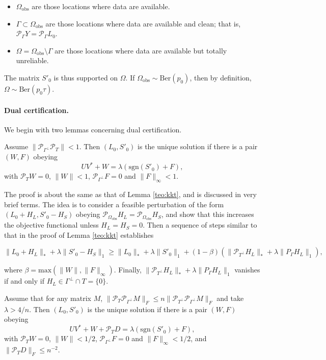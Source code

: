 \begin{itemize}
\item $\Omega_{\text{obs}}$ are those locations where data are available.
\item $\Gamma \subset \Omega_{\text{obs}}$ are those locations where data are available and clean; that is, $\mathcal{P}_\Gamma Y = \mathcal{P}_\Gamma L_0$.
\item $\Omega = \Omega_{\text{obs}} \setminus \Gamma$ are those locations where data are available but totally unreliable.
\end{itemize}

The matrix $S'_0$ is thus supported on $\Omega$. If $\Omega_{\text{obs}} \sim
\text{Ber}(p_0)$, then by definition, $\Omega \sim \text{Ber}(p_0
\tau)$.

\paragraph{Dual certification.} We begin with two lemmas concerning dual certification.

\begin{lemma}
\label{teo:kkt2}
Assume $\|\mathcal{P}_{\Gamma^\perp} \mathcal{P}_T\| < 1$.  Then $(L_0, S'_0)$ is the unique solution if there is a pair $(W, F)$ obeying
\[
UV^* + W = \lambda(\textrm{sgn}(S'_0) + F),  
\]
with $\mathcal{P}_T W = 0 $, $\|W\| < 1$, $\mathcal{P}_{\Gamma^\perp} F = 0$ and $\|F\|_\infty < 1$.
\end{lemma}

The proof is about the same as that of Lemma \ref{teo:kkt}, and is discussed in very brief terms. The idea is to consider a feasible perturbation of the form $(L_0 + H_L, S'_0 - H_S)$ obeying $\mathcal{P}_{\Omega_{\text{obs}}} H_L = \mathcal{P}_{\Omega_{\text{obs}}} H_S$, and show that this increases the objective functional unless $H_L = H_S = 0$. Then a sequence of steps similar to that in the proof of Lemma \ref{teo:kkt} establishes

\begin{equation}
\label{eq:kkt2}
\|L_0 + H_L\|_* + \lambda \|S'_0 - H_S\|_1 \ge \|L_0\|_* +
\lambda \|S'_0\|_1 + (1-\beta)(\|\mathcal{P}_{T^\perp} H_L\|_* + \lambda \|P_\Gamma
H_L\|_1), 
\end{equation}

where $\beta = \text{max}(\|W\|, \|F\|_\infty)$.  Finally, $\|\mathcal{P}_{T^\perp}
H_L\|_* + \lambda \|P_\Gamma H_L\|_1$ vanishes if and only if $H_L \in
\Gamma^\perp \cap T = \{0\}$.

\begin{lemma}
\label{teo:kktdg2}
Assume that for any matrix $M$, $\|\mathcal{P}_T \mathcal{P}_{\Gamma^\perp} M\|_F \le n \|\mathcal{P}_{T^\perp} \mathcal{P}_{\Gamma^\perp}
M\|_F$ and take $\lambda > 4/n$.  Then $(L_0, S'_0)$ is the unique solution if there is a pair $(W, F)$ obeying
\[
UV^* + W + \mathcal{P}_T D = \lambda(\textrm{sgn}(S'_0) + F),
\]
with $\mathcal{P}_T W = 0 $, $\|W\| < 1/2$, $\mathcal{P}_{\Gamma^\perp} F = 0$ and $\|F\|_\infty < 1/2$, and $\|\mathcal{P}_T D\|_F \le n^{-2}$.
\end{lemma}


